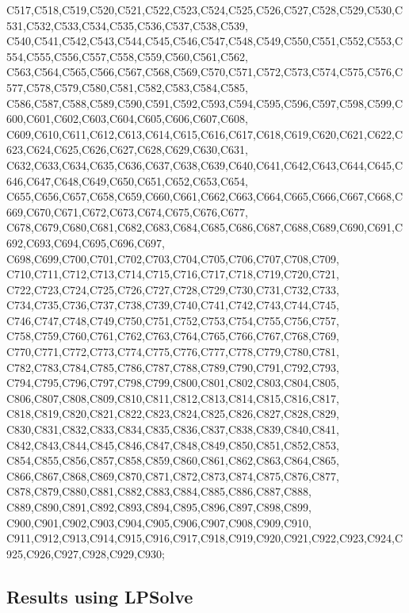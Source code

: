 C517,C518,C519,C520,C521,C522,C523,C524,C525,C526,C527,C528,C529,C530,C531,C532,C533,C534,C535,C536,C537,C538,C539,
C540,C541,C542,C543,C544,C545,C546,C547,C548,C549,C550,C551,C552,C553,C554,C555,C556,C557,C558,C559,C560,C561,C562,
C563,C564,C565,C566,C567,C568,C569,C570,C571,C572,C573,C574,C575,C576,C577,C578,C579,C580,C581,C582,C583,C584,C585,
C586,C587,C588,C589,C590,C591,C592,C593,C594,C595,C596,C597,C598,C599,C600,C601,C602,C603,C604,C605,C606,C607,C608,
C609,C610,C611,C612,C613,C614,C615,C616,C617,C618,C619,C620,C621,C622,C623,C624,C625,C626,C627,C628,C629,C630,C631,
C632,C633,C634,C635,C636,C637,C638,C639,C640,C641,C642,C643,C644,C645,C646,C647,C648,C649,C650,C651,C652,C653,C654,
C655,C656,C657,C658,C659,C660,C661,C662,C663,C664,C665,C666,C667,C668,C669,C670,C671,C672,C673,C674,C675,C676,C677,
C678,C679,C680,C681,C682,C683,C684,C685,C686,C687,C688,C689,C690,C691,C692,C693,C694,C695,C696,C697, C698,C699,C700,C701,C702,C703,C704,C705,C706,C707,C708,C709, C710,C711,C712,C713,C714,C715,C716,C717,C718,C719,C720,C721, C722,C723,C724,C725,C726,C727,C728,C729,C730,C731,C732,C733, C734,C735,C736,C737,C738,C739,C740,C741,C742,C743,C744,C745, C746,C747,C748,C749,C750,C751,C752,C753,C754,C755,C756,C757, C758,C759,C760,C761,C762,C763,C764,C765,C766,C767,C768,C769, C770,C771,C772,C773,C774,C775,C776,C777,C778,C779,C780,C781, C782,C783,C784,C785,C786,C787,C788,C789,C790,C791,C792,C793, C794,C795,C796,C797,C798,C799,C800,C801,C802,C803,C804,C805, C806,C807,C808,C809,C810,C811,C812,C813,C814,C815,C816,C817, C818,C819,C820,C821,C822,C823,C824,C825,C826,C827,C828,C829, C830,C831,C832,C833,C834,C835,C836,C837,C838,C839,C840,C841, C842,C843,C844,C845,C846,C847,C848,C849,C850,C851,C852,C853, C854,C855,C856,C857,C858,C859,C860,C861,C862,C863,C864,C865, C866,C867,C868,C869,C870,C871,C872,C873,C874,C875,C876,C877, C878,C879,C880,C881,C882,C883,C884,C885,C886,C887,C888, C889,C890,C891,C892,C893,C894,C895,C896,C897,C898,C899, C900,C901,C902,C903,C904,C905,C906,C907,C908,C909,C910, C911,C912,C913,C914,C915,C916,C917,C918,C919,C920,C921,C922,C923,C924,C925,C926,C927,C928,C929,C930;

\subsection{Results using LPSolve}

